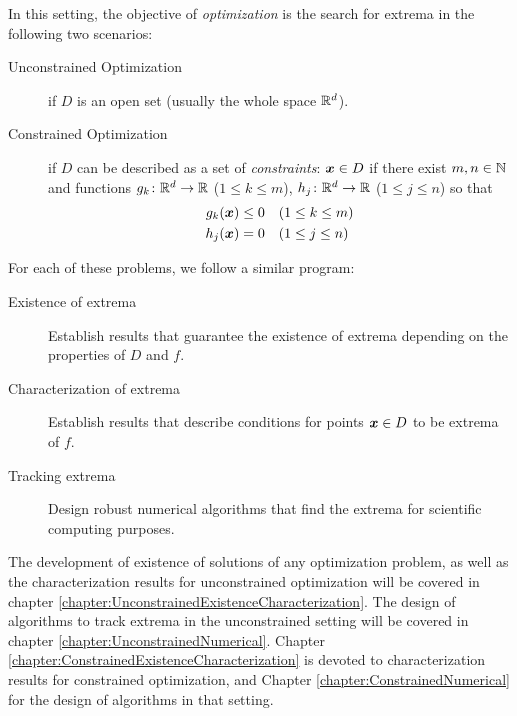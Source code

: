 In this setting, the objective of \emph{optimization} is the search for extrema in the following two scenarios:
\begin{description}
	\item [Unconstrained Optimization] if $D$ is an open set (usually the whole space $\mathbb{R}^d$). 
	\item [Constrained Optimization] if $D$ can be described as a set of \emph{constraints}: $\boldsymbol{x} \in D$ if there exist $m,n \in \mathbb{N}$ and functions $g_k\colon \mathbb{R}^d \to \mathbb{R}$ ($1\leq k \leq m$), $h_j\colon \mathbb{R}^d \to \mathbb{R}$ ($1\leq j \leq n$) so that
	\begin{align*}
	g_k(\boldsymbol{x}) &\leq  0 \quad (1\leq k \leq m) \\
	h_j(\boldsymbol{x}) &= 0     \quad (1\leq j \leq n)
	\end{align*} 
\end{description}
For each of these problems, we follow a similar program:
\begin{description}
	\item[Existence of extrema] Establish results that guarantee the existence of extrema depending on the properties of $D$ and $f$. 
	\item[Characterization of extrema] Establish results that describe conditions for points $\boldsymbol{x} \in D$ to be extrema of $f$.  
	\item[Tracking extrema] Design robust numerical algorithms that find the extrema for scientific computing purposes.
\end{description}
The development of existence of solutions of any optimization problem, as well as the characterization results for unconstrained optimization will be covered in chapter \ref{chapter:UnconstrainedExistenceCharacterization}.  The design of algorithms to track extrema in the unconstrained setting will be covered in chapter \ref{chapter:UnconstrainedNumerical}.  Chapter \ref{chapter:ConstrainedExistenceCharacterization} is devoted to characterization results for constrained optimization, and Chapter \ref{chapter:ConstrainedNumerical} for the design of algorithms in that setting.









